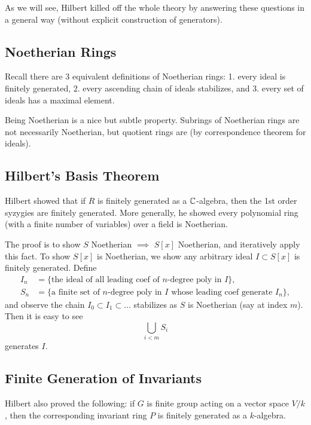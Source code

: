 As we will see, Hilbert killed off the whole theory by answering these questions in a general way (without explicit construction of generators).

\subsection{Noetherian Rings}
Recall there are 3 equivalent definitions of Noetherian rings: 1. every ideal is finitely generated, 2. every ascending chain of ideals stabilizes, and 3. every set of ideals has a maximal element.

Being Noetherian is a nice but subtle property. Subrings of Noetherian rings are not necessarily Noetherian, but quotient rings are (by correspondence theorem for ideals).

\subsection{Hilbert's Basis Theorem}
Hilbert showed that if $R$ is finitely generated as a ${\mathbb C}$-algebra, then the 1st order syzygies are finitely generated. More generally, he showed every polynomial ring (with a finite number of variables) over a field is Noetherian.

The proof is to show $S$ Noetherian $\implies$ $S[x]$ Noetherian, and iteratively apply this fact. To show $S[x]$ is Noetherian, we show any arbitrary ideal $I \subset S[x]$ is finitely generated. Define
\[
    \begin{split}
        I_n &= \{\text{the ideal of all leading coef of $n$-degree poly in } I \},\\
        S_n &= \{\text{a finite set of $n$-degree poly in $I$ whose leading coef generate } I_n \},
    \end{split}
\]
and observe the chain $I_0 \subset I_1 \subset \dots$ stabilizes as $S$ is Noetherian (say at index $m$). Then it is easy to see
\[
    \bigcup_{i < m} S_i
\]
generates $I$.

\subsection{Finite Generation of Invariants}
Hilbert also proved the following: if $G$ is finite group acting on a vector space $V/k$, then the corresponding invariant ring $P$ is finitely generated as a $k$-algebra.

